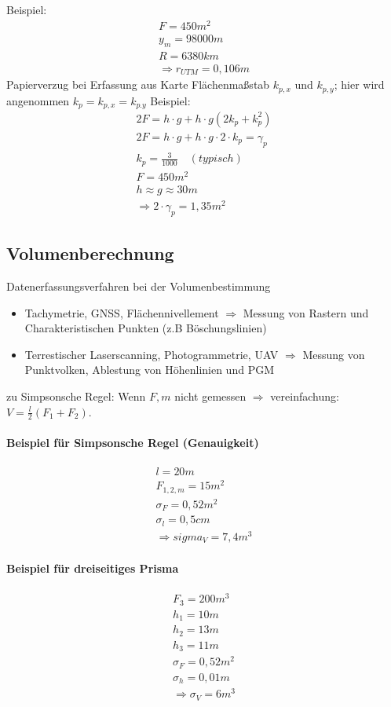 \documentclass[12pt]{article}
\begin{document}
Beispiel:
\begin{gather*}
	F = 450m^2 \\
	y_m = 98000m \\
	R = 6380 km \\
	\Rightarrow r_{UTM} = 0,106m
\end{gather*}
Papierverzug bei Erfassung aus Karte\newline
Flächenmaßstab $k_{p,x}$ und $k_{p,y}$; hier wird angenommen $k_p = k_{p,x} = k_{p.y}$ \newline
Beispiel:
\begin{gather*}
	2F = h\cdot g + h \cdot g (2 k_p + k_p^2) \\
	2F = h \cdot g + h \cdot g \cdot 2 \cdot k_p = \gamma_p \\
	k_p = \frac{3}{1000}\quad (typisch) \\
	F = 450m^2 \\
	h \approx g \approx 30m \\
	\Longrightarrow 2 \cdot \gamma_p = 1,35 m^2
\end{gather*}
\subsection{Volumenberechnung}
Datenerfassungsverfahren bei der Volumenbestimmung 
\begin{itemize}
	\item Tachymetrie, GNSS, Flächennivellement $\Longrightarrow$ Messung von Rastern und Charakteristischen Punkten (z.B Böschungslinien)
	\item Terrestischer Laserscanning, Photogrammetrie, UAV $\Longrightarrow$ Messung von Punktvolken, Ablestung von Höhenlinien und PGM
\end{itemize}
zu Simpsonsche Regel: \newline
Wenn $F,m$ nicht gemessen $\Longrightarrow$ vereinfachung: $V = \frac{l}{2}(F_1 + F_2)$.
\paragraph{Beispiel für Simpsonsche Regel (Genauigkeit)}
\begin{gather*}
	l = 20 m \\
	F_{1,2,m} = 15m^2 \\
	\sigma_F = 0,52m^2 \\
	\sigma_l = 0,5cm \\
	\Rightarrow sigma_V = 7,4m^3 
\end{gather*}
\paragraph{Beispiel für dreiseitiges Prisma}
\begin{gather*}
	F_3 = 200m^3 \\
	h_1 = 10m \\
	h_2 = 13m \\
	h_3 =11m \\
	\sigma_F = 0,52 m^2 \\
	\sigma_h = 0,01 m \\
	\Rightarrow \sigma_V = 6m^3
\end{gather*}
\end{document}
